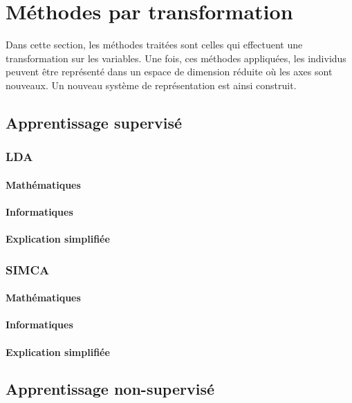 \documentclass[12pt]{article}
\begin{document}
\section{Méthodes par transformation}

Dans cette section, les méthodes traitées sont celles qui effectuent une transformation sur les variables. Une fois, ces méthodes appliquées, les individus peuvent être représenté dans un espace de dimension réduite où les axes sont nouveaux. Un nouveau système de représentation est ainsi construit.

\subsection{Apprentissage supervisé}

\subsubsection{LDA}

\paragraph{Mathématiques}
\paragraph{Informatiques}
\paragraph{Explication simplifiée}

\subsubsection{SIMCA}

\paragraph{Mathématiques}
\paragraph{Informatiques}
\paragraph{Explication simplifiée}

\subsection{Apprentissage non-supervisé}
\end{document}
